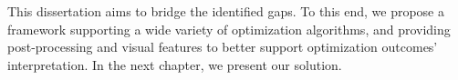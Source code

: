 	This dissertation aims to bridge the identified gaps. To this end, we propose a framework supporting a wide variety of optimization algorithms, and providing post-processing and visual features to better support optimization outcomes' interpretation. In the next chapter, we present our solution.	
	
		